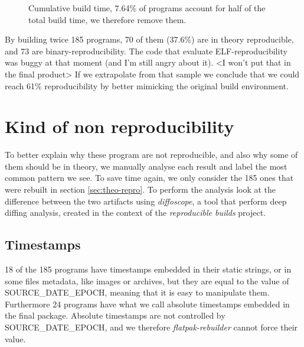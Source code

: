 \documentclass[a4paper,11pt,oneside]{report}
\theoremstyle{definition}
\newcommand{\sysname}{\emph{flatpak-rebuilder}\xspace}
\newcommand{\rb}{\emph{reproducible builds}\xspace}
\newcommand{\sde}{SOURCE\_DATE\_EPOCH\xspace}
\newcommand{\dfc}{\emph{diffoscope}\xspace}
\begin{document}
\begin{figure}[h]
    \caption{Cumulative build time, 7.64\% of programs
    account for half of the total build time, we therefore remove them.}
    \label{fig:buildtime}
\end{figure}

By building twice 185 programs, 70 of them (37.6\%) are in theory reproducible,
and 73 are binary-reproducibility. The code that evaluate ELF-reproducibility
was buggy at that moment (and I'm still angry about it). <I won't put that in
the final product>
If we extrapolate from that sample we conclude that we could reach 61\%
reproducibility by better mimicking the original build environment.

\section{Kind of non reproducibility}
To better explain why these program are not reproducible, and also why some of
them should be in theory, we manually analyse each result and label the most
common pattern we see. To save time again, we only consider the 185 ones that
were rebuilt in section \autoref{sec:theo-repro}. To perform the analysis look
at the difference between the two artifacts using \dfc, a tool that perform
deep diffing analysis, created in the context of the \rb project.

\subsection{Timestamps}
18 of the 185 programs have timestamps embedded in their static strings, or in
some files metadata, like images or archives, but they are equal to the value
of \sde, meaning that it is easy to manipulate them. Furthermore 24 programs
have what we call absolute timestamps embedded in the final package. Absolute
timestamps are not controlled by \sde, and we therefore \sysname cannot force
their value.
\end{document}
